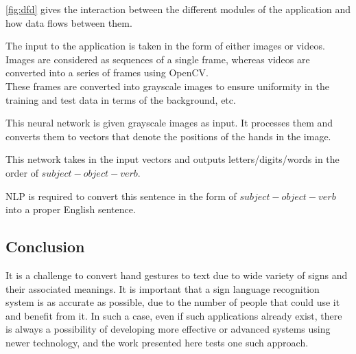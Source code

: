 \documentclass[12pt,oneside,a4paper]{article}
\begin{document}
			\autoref{fig:dfd} gives the interaction between the different modules of the application and how data flows between them. \\

			\begin{description}[style=nextline]

				\item[Input] The input to the application is taken in the form of either images or videos. Images are considered as sequences of a single frame, whereas videos are converted into a series of frames using OpenCV. \\
				These frames are converted into grayscale images to ensure uniformity in the training and test data in terms of the background, etc.

				\item[Convolutional Neural Network] This neural network is given grayscale images as input. It processes them and converts them to vectors that denote the positions of the hands in the image.

				\item[Recurrent Neural Network] This network takes in the input vectors and outputs letters/digits/words in the order of $subject - object - verb$.

				\item[Natural Language Processing module] NLP is required to convert this sentence in the form of $subject - object - verb$ into a proper English sentence.

			\end{description}

		\subsection{Conclusion}
			It is a challenge to convert hand gestures to text due to wide variety of signs and their associated meanings. It is important that a sign language recognition system is as accurate as possible, due to the number of people that could use it and benefit from it. In such a case, even if such applications already exist, there is always a possibility of developing more effective or advanced systems using newer technology, and the work presented here tests one such approach.

	
	{}
\end{document}

